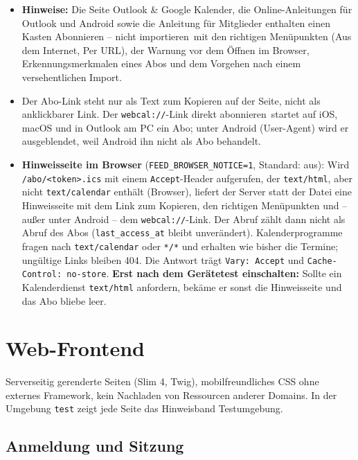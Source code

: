 \documentclass[a4paper,fontsize=10pt]{scrartcl}
\newcommand{\code}[1]{\texttt{#1}}
\begin{document}
\begin{itemize}
  \item \textbf{Hinweise:} Die Seite \glqq Outlook \& Google Kalender\grqq,
        die Online-Anleitungen für Outlook und Android sowie die Anleitung für
        Mitglieder enthalten einen Kasten \glqq Abonnieren -- nicht
        importieren\grqq\ mit den richtigen Menüpunkten (\glqq Aus dem
        Internet\grqq, \glqq Per URL\grqq), der Warnung vor dem Öffnen im
        Browser, Erkennungsmerkmalen eines Abos und dem Vorgehen nach einem
        versehentlichen Import.
  \item Der Abo-Link steht nur als Text zum Kopieren auf der Seite, nicht als
        anklickbarer Link. Der \code{webcal://}-Link \glqq direkt
        abonnieren\grqq\ startet auf iOS, macOS und in Outlook am PC ein Abo;
        unter Android (User-Agent) wird er ausgeblendet, weil Android ihn
        nicht als Abo behandelt.
  \item \textbf{Hinweisseite im Browser} (\code{FEED\_BROWSER\_NOTICE=1},
        Standard: aus): Wird \code{/abo/<token>.ics} mit einem
        \code{Accept}-Header aufgerufen, der \code{text/html}, aber nicht
        \code{text/calendar} enthält (Browser), liefert der Server statt der
        Datei eine Hinweisseite mit dem Link zum Kopieren, den richtigen
        Menüpunkten und -- außer unter Android -- dem \code{webcal://}-Link.
        Der Abruf zählt dann nicht als Abruf des Abos
        (\code{last\_access\_at} bleibt unverändert). Kalenderprogramme
        fragen nach \code{text/calendar} oder \code{*/*} und erhalten wie
        bisher die Termine; ungültige Links bleiben 404. Die Antwort trägt
        \code{Vary: Accept} und \code{Cache-Control: no-store}.
        \textbf{Erst nach dem Gerätetest einschalten:} Sollte ein
        Kalenderdienst \code{text/html} anfordern, bekäme er sonst die
        Hinweisseite und das Abo bliebe leer.
\end{itemize}

\section{Web-Frontend}

Serverseitig gerenderte Seiten (Slim 4, Twig), mobilfreundliches CSS ohne
externes Framework, kein Nachladen von Ressourcen anderer Domains. In der
Umgebung \code{test} zeigt jede Seite das Hinweisband
\glqq Testumgebung\grqq.

\subsection{Anmeldung und Sitzung}\label{sec:anmeldung}
\end{document}
